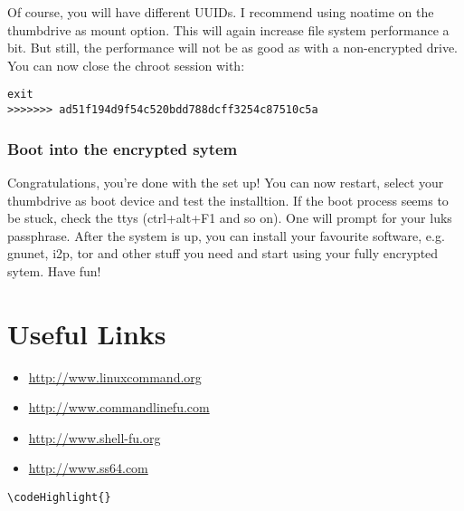 \documentclass[12pt,a4paper]{article}
\begin{document}
Of course, you will have different UUIDs. I recommend using noatime on the thumbdrive as mount option. This will again increase file system performance a bit. But still, the performance will not be as good as with a non-encrypted drive. You can now close the chroot session with:
\begin{Verbatim}[commandchars=\\\{\}]
exit
>>>>>>> ad51f194d9f54c520bdd788dcff3254c87510c5a
\end{Verbatim}

\subsubsection{Boot into the encrypted sytem}
Congratulations, you're done with the set up! You can now restart, select your thumbdrive as boot device and test the installtion. If the boot process seems to be stuck, check the ttys (ctrl+alt+F1 and so on). One will prompt for your luks passphrase. After the system is up, you can install your favourite software, e.g. gnunet, i2p, tor and other stuff you need and start using your fully encrypted sytem. Have fun!

\section{Useful Links}
\begin{itemize}
\item{\url{http://www.linuxcommand.org}}
\item{\url{http://www.commandlinefu.com}}
\item{\url{http://www.shell-fu.org}}
\item{\url{http://www.ss64.com}}
\end{itemize}
\begin{Verbatim}[commandchars=\\\{\}]
\codeHighlight{}
\end{Verbatim}
\end{document}
